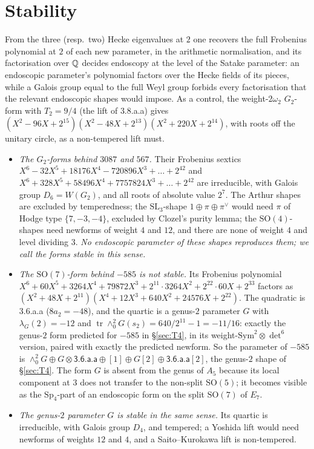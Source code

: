 \documentclass[11pt]{amsart}
\theoremstyle{definition}
\begin{document}
\section{Stability}
\label{sec:stab} From the three (resp.\ two) Hecke eigenvalues at $2$ one recovers the full Frobenius polynomial at $2$ of each new parameter, in the arithmetic normalisation, and its factorisation over $\mathbb{Q}$ decides endoscopy at the level of the Satake parameter: an endoscopic parameter's polynomial factors over the Hecke fields of its pieces, while a Galois group equal to the full Weyl group forbids every factorisation that the relevant endoscopic shapes would impose. As a control, the weight-$2\omega_2$ $G_2$-form with $T_2=9/4$ (the lift of \textsf{3.8.a.a}) gives $(X^2-96X+2^{15})(X^2-48X+2^{13})(X^2+220X+2^{14})$, with roots off the unitary circle, as a non-tempered lift must.
\begin{itemize}
\item \emph{The $G_2$-forms behind $3087$ and $567$.} Their Frobenius sextics $X^6-32X^5+18176X^4-720896X^3+\dots+2^{42}$ and $X^6+328X^5+58496X^4+7757824X^3+\dots+2^{42}$ are irreducible, with Galois group $D_6=W(G_2)$, and all roots of absolute value $2^7$. The Arthur shapes are excluded by temperedness; the $\mathrm{SL}_3$-shape $1\oplus\pi\oplus\pi^\vee$ would need $\pi$ of Hodge type $\{7,-3,-4\}$, excluded by Clozel's purity lemma; the $\mathrm{SO}(4)$-shapes need newforms of weight $4$ and $12$, and there are none of weight $4$ and level dividing $3$. \emph{No endoscopic parameter of these shapes reproduces them; we call the forms stable in this sense.}
\item \emph{The $\mathrm{SO}(7)$-form behind $-585$ is not stable.} Its Frobenius polynomial $X^6+60X^5+3264X^4+79872X^3+2^{11}\!\cdot3264X^2+2^{22}\!\cdot60X+2^{33}$ factors as $(X^2+48X+2^{11})(X^4+12X^3+640X^2+24576X+2^{22})$. The quadratic is \textsf{3.6.a.a} ($8a_2=-48$), and the quartic is a genus-$2$ parameter $G$ with $\lambda_G(2)=-12$ and $\operatorname{tr}\wedge^2_0G(s_2)=640/2^{11}-1=-11/16$: exactly the genus-$2$ form predicted for $-585$ in \S\ref{sec:T4}, in its weight-$\mathrm{Sym}^2\otimes\det^6$ version, paired with exactly the predicted newform. So the parameter of $-585$ is $\wedge^2_0G\oplus G\otimes\textsf{3.6.a.a}\oplus[1]\oplus G[2]\oplus\textsf{3.6.a.a}[2]$, the genus-$2$ shape of \S\ref{sec:T4}. The form $G$ is absent from the genus of $A_5$ because its local component at $3$ does not transfer to the non-split $\mathrm{SO}(5)$; it becomes visible as the $\mathrm{Sp}_4$-part of an endoscopic form on the split $\mathrm{SO}(7)$ of $E_7$.
\item \emph{The genus-$2$ parameter $G$ is stable in the same sense.} Its quartic is irreducible, with Galois group $D_4$, and tempered; a Yoshida lift would need newforms of weights $12$ and $4$, and a Saito--Kurokawa lift is non-tempered.
\end{itemize}
\end{document}
